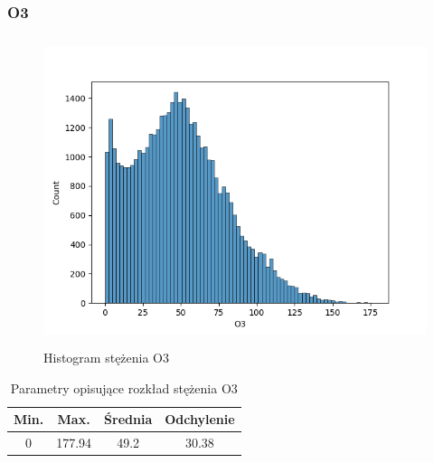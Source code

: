 \documentclass[18pt, letterpaper]{article}
\begin{document}
\subsubsection{O3}
\begin{figure}[H]
\centering
\includegraphics[width=120mm, height=90mm]{visualisations/histograms/O3_hist.png}
\caption{Histogram stężenia O3}
\end{figure}
\begin{table}[H]
\centering
\begin{tabular}{|c|c|c|c|}
\hline
Min.  & Max. & Średnia & Odchylenie \\ \hline
0 & 177.94 & 49.2   & 30.38      \\ \hline
\end{tabular}
\caption{Parametry opisujące rozkład stężenia O3}
\end{table}
\end{document}
